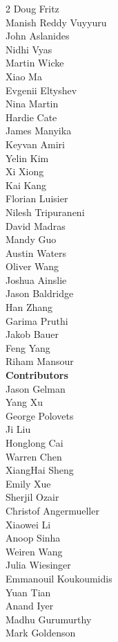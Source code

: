 \begin{multicols}{2}
Doug Fritz \\
Manish Reddy Vuyyuru \\
John Aslanides \\
Nidhi Vyas \\
Martin Wicke \\
Xiao Ma \\
Evgenii Eltyshev \\
Nina Martin \\
Hardie Cate \\
James Manyika \\
Keyvan Amiri \\
Yelin Kim \\
Xi Xiong \\
Kai Kang \\
Florian Luisier \\
Nilesh Tripuraneni \\
David Madras \\
Mandy Guo \\
Austin Waters \\
Oliver Wang \\
Joshua Ainslie \\
Jason Baldridge \\
Han Zhang \\
Garima Pruthi \\
Jakob Bauer \\
Feng Yang \\
Riham Mansour \\
\textbf{Contributors} \\
Jason Gelman \\
Yang Xu \\
George Polovets \\
Ji Liu \\
Honglong Cai \\
Warren Chen \\
XiangHai Sheng \\
Emily Xue \\
Sherjil Ozair \\
Christof Angermueller \\
Xiaowei Li \\
Anoop Sinha \\
Weiren Wang \\
Julia Wiesinger \\
Emmanouil Koukoumidis \\
Yuan Tian \\
Anand Iyer \\
Madhu Gurumurthy \\
Mark Goldenson \\

\end{multicols}
